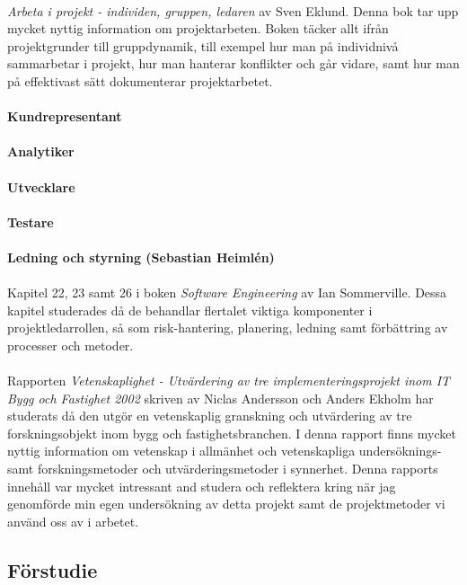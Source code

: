 \documentclass[conference]{IEEEtran}
\begin{document}
\\
\textit{Arbeta i projekt - individen, gruppen, ledaren} av Sven Eklund\cite{Eklund14}. Denna bok tar upp mycket nyttig information om projektarbeten. Boken täcker allt ifrån projektgrunder till gruppdynamik, till exempel hur man på individnivå sammarbetar i projekt, hur man hanterar konflikter och går vidare, samt hur man på effektivast sätt dokumenterar projektarbetet.\\
\\
\textbf{Kundrepresentant}\\
\\
\textbf{Analytiker}\\
\\
\textbf{Utvecklare}\\
\\
\textbf{Testare}\\
\\
\textbf{Ledning och styrning (Sebastian Heimlén)}\\
\\
Kapitel 22, 23 samt 26 i boken \textit{Software Engineering} av Ian Sommerville\cite{Sommerville10}. Dessa kapitel studerades då de behandlar flertalet viktiga komponenter i projektledarrollen, så som risk-hantering, planering, ledning samt förbättring av processer och metoder.\\
\\
Rapporten \textit{Vetenskaplighet - Utvärdering av tre implementeringsprojekt inom IT Bygg och Fastighet 2002} skriven av Niclas Andersson och Anders Ekholm\cite{Andersson02} har studerats då den utgör en vetenskaplig granskning och utvärdering av tre forskningsobjekt inom bygg och fastighetsbranchen. I denna rapport finns mycket nyttig information om vetenskap i allmänhet och vetenskapliga undersöknings- samt forskningsmetoder och utvärderingsmetoder i synnerhet. Denna rapports innehåll var mycket intressant and studera och reflektera kring när jag genomförde min egen undersökning av detta projekt samt de projektmetoder vi använd oss av i arbetet.
\subsection{Förstudie}
\end{document}

